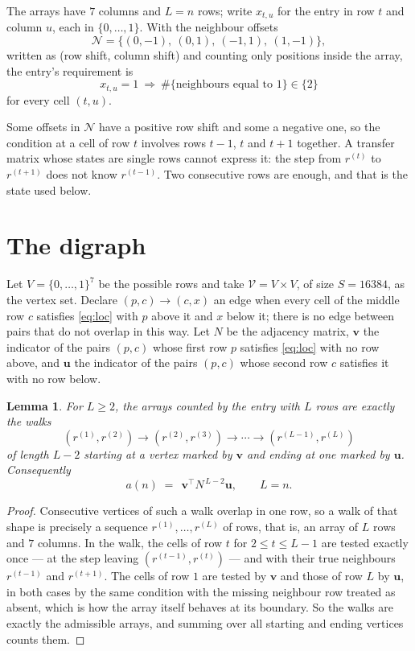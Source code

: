 \documentclass[11pt,a4paper]{article}
\theoremstyle{plain}
\newtheorem{lemma}[theorem]{Lemma}
\theoremstyle{definition}
\begin{document}
The arrays have $7$ columns and $L=n$ rows; write $x_{t,u}$ for the entry in
row $t$ and column $u$, each in $\{0,\dots,1\}$. With the neighbour offsets
\[
\mathcal N=\{(0,-1),\ (0,1),\ (-1,1),\ (1,-1)\},
\]
written as (row shift, column shift) and counting only positions inside the array, the
entry's requirement is
\begin{equation}\label{eq:loc}
x_{t,u}=1\ \Rightarrow\ \#\{\text{neighbours equal to }1\}\in\{2\}
\end{equation}
for every cell $(t,u)$.

Some offsets in $\mathcal N$ have a positive row shift and some a negative one, so the
condition at a cell of row $t$ involves rows $t-1$, $t$ and $t+1$ together. A transfer
matrix whose states are single rows cannot express it: the step from $r^{(t)}$ to
$r^{(t+1)}$ does not know $r^{(t-1)}$. Two consecutive rows are enough, and that is
the state used below.

\section{The digraph}

Let $V=\{0,\dots,1\}^{7}$ be the possible rows and take
$\mathcal V=V\times V$, of size $S=16384$, as the vertex set. Declare $(p,c)\to(c,x)$ an edge
when every cell of the middle row $c$ satisfies \eqref{eq:loc} with $p$ above it and $x$
below it; there is no edge between pairs that do not overlap in this way. Let $N$ be the
adjacency matrix, $\mathbf{v}$ the indicator of the pairs $(p,c)$ whose first row $p$
satisfies \eqref{eq:loc} with no row above, and $\mathbf{u}$ the indicator of
the pairs $(p,c)$ whose second row $c$ satisfies it with no row below.

\begin{lemma}\label{lem:walk}
For $L\ge2$, the arrays counted by the entry with $L$ rows are exactly the walks
\[
(r^{(1)},r^{(2)})\to(r^{(2)},r^{(3)})\to\cdots\to(r^{(L-1)},r^{(L)})
\]
of length $L-2$ starting at a vertex marked by $\mathbf{v}$ and ending at one marked by
$\mathbf{u}$. Consequently
\[
a(n)\;=\;\,\mathbf{v}^{\!\top}N^{\,L-2}\mathbf{u},\qquad L=n .
\]
\end{lemma}

\begin{proof}
Consecutive vertices of such a walk overlap in one row, so a walk of that shape is
precisely a sequence $r^{(1)},\dots,r^{(L)}$ of rows, that is, an array of $L$ rows
and $7$ columns. In the walk, the cells of row $t$ for $2\le t\le L-1$ are tested
exactly once --- at the step leaving $(r^{(t-1)},r^{(t)})$ --- and with their true
neighbours $r^{(t-1)}$ and $r^{(t+1)}$. The cells of row $1$ are tested by
$\mathbf{v}$ and those of row $L$ by $\mathbf{u}$, in both cases by the same condition
with the missing neighbour row treated as absent, which is how the array itself behaves at
its boundary. So the walks are exactly the admissible arrays, and summing over all starting
and ending vertices counts them.
\end{proof}
\end{document}
